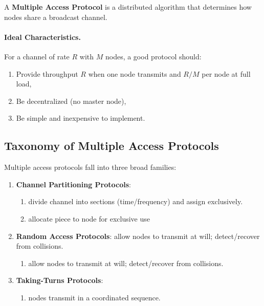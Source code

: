 \documentclass[12pt]{article}
\begin{document}
A \textbf{Multiple Access Protocol} is a distributed algorithm that determines how nodes share a broadcast channel.

\paragraph{Ideal Characteristics.}
For a channel of rate $R$ with $M$ nodes, a good protocol should:
\begin{enumerate}
    \item Provide throughput $R$ when one node transmits and $R/M$ per node at full load,
    \item Be decentralized (no master node),
    \item Be simple and inexpensive to implement.
\end{enumerate}

\subsection{Taxonomy of Multiple Access Protocols}

Multiple access protocols fall into three broad families:

\begin{enumerate}
    \item \textbf{Channel Partitioning Protocols}:
          \begin{enumerate}
              \item divide channel into sections (time/frequency) and assign exclusively.
              \item allocate piece to node for exclusive use
          \end{enumerate}
    \item \textbf{Random Access Protocols}: allow nodes to transmit at will; detect/recover from collisions.
          \begin{enumerate}
              \item allow nodes to transmit at will; detect/recover from collisions.
          \end{enumerate}
    \item \textbf{Taking-Turns Protocols}:
          \begin{enumerate}
              \item nodes transmit in a coordinated sequence.
          \end{enumerate}
\end{enumerate}
\end{document}
